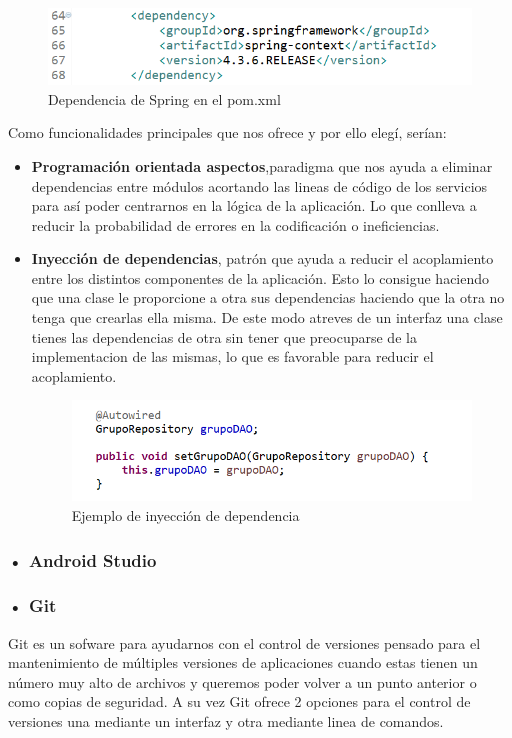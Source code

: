 \begin{figure}[H]
		\centering
		\includegraphics[width=1\textwidth] {spring.png}
		\caption{Dependencia de Spring en el pom.xml }
	\end{figure}
	
	
Como funcionalidades principales que nos ofrece y por ello elegí, serían:

\begin{itemize}
\item \textbf{Programación orientada aspectos},paradigma que nos ayuda a eliminar dependencias entre módulos acortando las lineas de código de los servicios para así poder centrarnos en la lógica de la aplicación. Lo que conlleva a reducir  la probabilidad de errores en la codificación o ineficiencias.


\item\textbf{ Inyección de dependencias}, patrón que ayuda a reducir el acoplamiento entre los distintos componentes de la aplicación. Esto lo consigue haciendo que una clase le proporcione a otra sus dependencias haciendo que la otra no tenga que crearlas ella misma. De este modo atreves de un interfaz una clase tienes las dependencias de otra sin tener que preocuparse de la implementacion de las mismas, lo que es favorable para reducir el acoplamiento.

\begin{figure}[H]
		\centering
		\includegraphics[width=1\textwidth] {dao.png}
		\caption{Ejemplo de inyección de dependencia }
	\end{figure}


\end{itemize}
\subsubsection{• Android Studio}
\subsubsection{• Git}
Git es un sofware para ayudarnos con el control de versiones  pensado para el mantenimiento de múltiples versiones de aplicaciones cuando estas tienen un número muy alto de archivos y queremos poder volver a un punto anterior o como copias de seguridad. A su vez Git ofrece 2 opciones para el control de versiones una mediante un interfaz y otra mediante linea de comandos.
